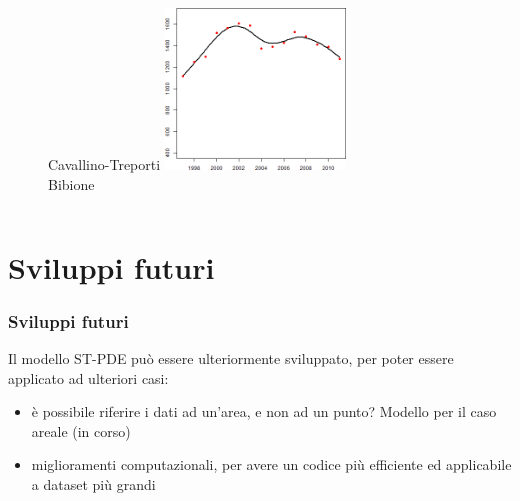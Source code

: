 \documentclass[landscape,9pt]{beamer}                           %
\begin{document}
\begin{frame}
\begin{columns}
\begin{column}{0.45\textwidth}
\begin{figure}
\begin{multicols}{2}
	Cavallino-Treporti
	\includegraphics[width=0.45\textwidth]{Immagini/VeneziaCovar/Bibione.png}\\
	Bibione
	\end{multicols}
	\end{figure}
	\end{column}
	
	\begin{column}{0.35\textwidth}	
		\begin{center}		
		\end{center}
	\end{column}
\end{columns}
\end{frame}

\section{Sviluppi futuri}
\begin{frame}
\frametitle{Sviluppi futuri}
Il modello ST-PDE può essere ulteriormente sviluppato, per poter essere applicato ad ulteriori casi:
\begin{itemize}
\item<2-> è possibile riferire i dati ad un'area, e non ad un punto? Modello per il caso areale (in corso)
\item<3-> miglioramenti computazionali, per avere un codice più efficiente ed applicabile a dataset più grandi
\end{itemize}

\end{frame}
\end{document}
